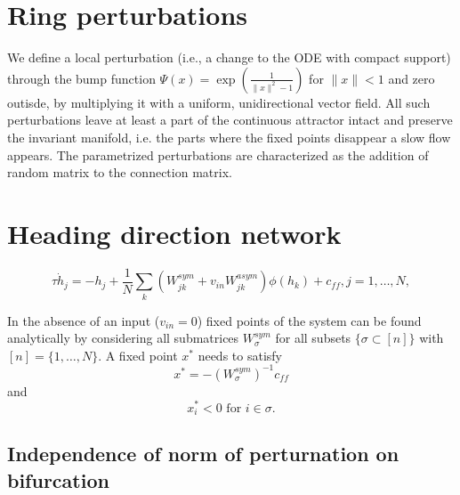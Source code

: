 \documentclass{article} %
\newcounter{ct}
\theoremstyle{definition}
\theoremstyle{remark}
\begin{document}
\newpage
\section{Ring perturbations}\label{sec:supp:ring_perturbations}

We define a local perturbation (i.e., a change to the ODE with compact support) through the bump function $\Psi(x) = \exp\left(\frac{1}{\|x\|^2-1}\right)$ for $\|x\|<1$ and zero outisde, by multiplying it with a uniform, unidirectional vector field. All such perturbations leave at least a part of the continuous attractor intact and preserve the invariant manifold, i.e. the parts where the fixed points disappear a slow flow appears.
The parametrized perturbations are characterized as the addition of random matrix to the connection matrix. 



\section{Heading direction network}\label{sec:supp:headdirection}

\begin{equation}
\tau \dot h_j = -h_j + \frac{1}{N} \sum_k (W^{sym}_{jk} + v_{in} W^{asym}_{jk})\phi(h_k)+c_{ff},     j=1,\dots,N,
\end{equation}

In the absence of an input ($v_{in}=0$) fixed points of the system can be found analytically by considering all submatrices $W^{sym}_\sigma$ for all subsets $\{\sigma\subset [n]\}$ with$[n]=\{1,\dots, N\}$.
A fixed point $x^*$ needs to satisfy
\begin{equation}
x^*= -(W^{sym}_\sigma)^{-1}c_{ff}
\end{equation}
and 
\begin{equation}
x^*_i<0 \text{   for  	 } i\in\sigma.
\end{equation}

\newpage
\subsection{Independence of norm of perturnation on bifurcation}
\end{document}
